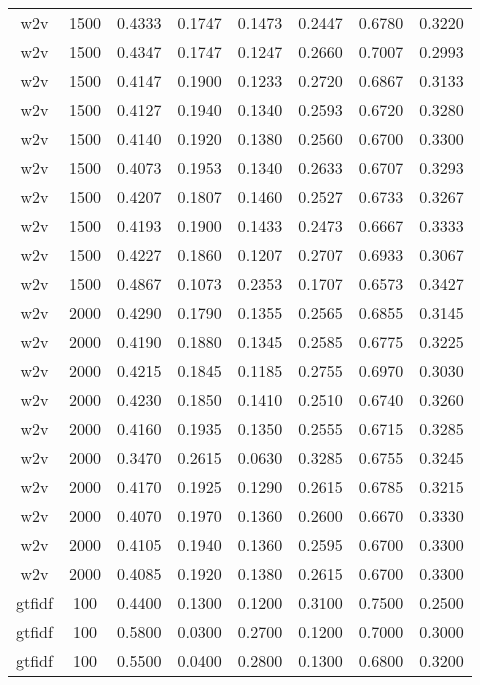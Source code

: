 \begin{table}[h!]
\begin{tabularx}{\textwidth}{cccccccc}
		w2v      & 1500 & 0.4333 & 0.1747 & 0.1473 & 0.2447 & 0.6780 & 0.3220 \\
		w2v      & 1500 & 0.4347 & 0.1747 & 0.1247 & 0.2660 & 0.7007 & 0.2993 \\
		w2v      & 1500 & 0.4147 & 0.1900 & 0.1233 & 0.2720 & 0.6867 & 0.3133 \\
		w2v      & 1500 & 0.4127 & 0.1940 & 0.1340 & 0.2593 & 0.6720 & 0.3280 \\
		w2v      & 1500 & 0.4140 & 0.1920 & 0.1380 & 0.2560 & 0.6700 & 0.3300 \\
		w2v      & 1500 & 0.4073 & 0.1953 & 0.1340 & 0.2633 & 0.6707 & 0.3293 \\
		w2v      & 1500 & 0.4207 & 0.1807 & 0.1460 & 0.2527 & 0.6733 & 0.3267 \\
		w2v      & 1500 & 0.4193 & 0.1900 & 0.1433 & 0.2473 & 0.6667 & 0.3333 \\
		w2v      & 1500 & 0.4227 & 0.1860 & 0.1207 & 0.2707 & 0.6933 & 0.3067 \\
		w2v      & 1500 & 0.4867 & 0.1073 & 0.2353 & 0.1707 & 0.6573 & 0.3427 \\
		w2v      & 2000 & 0.4290 & 0.1790 & 0.1355 & 0.2565 & 0.6855 & 0.3145 \\
		w2v      & 2000 & 0.4190 & 0.1880 & 0.1345 & 0.2585 & 0.6775 & 0.3225 \\
		w2v      & 2000 & 0.4215 & 0.1845 & 0.1185 & 0.2755 & 0.6970 & 0.3030 \\
		w2v      & 2000 & 0.4230 & 0.1850 & 0.1410 & 0.2510 & 0.6740 & 0.3260 \\
		w2v      & 2000 & 0.4160 & 0.1935 & 0.1350 & 0.2555 & 0.6715 & 0.3285 \\
		w2v      & 2000 & 0.3470 & 0.2615 & 0.0630 & 0.3285 & 0.6755 & 0.3245 \\
		w2v      & 2000 & 0.4170 & 0.1925 & 0.1290 & 0.2615 & 0.6785 & 0.3215 \\
		w2v      & 2000 & 0.4070 & 0.1970 & 0.1360 & 0.2600 & 0.6670 & 0.3330 \\
		w2v      & 2000 & 0.4105 & 0.1940 & 0.1360 & 0.2595 & 0.6700 & 0.3300 \\
		w2v      & 2000 & 0.4085 & 0.1920 & 0.1380 & 0.2615 & 0.6700 & 0.3300 \\
		gtfidf   & 100  & 0.4400 & 0.1300 & 0.1200 & 0.3100 & 0.7500 & 0.2500 \\
		gtfidf   & 100  & 0.5800 & 0.0300 & 0.2700 & 0.1200 & 0.7000 & 0.3000 \\
		gtfidf   & 100  & 0.5500 & 0.0400 & 0.2800 & 0.1300 & 0.6800 & 0.3200 \\

\end{tabularx}
\end{table}
